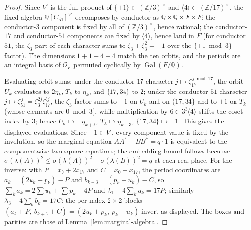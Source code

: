\documentclass[11pt]{article}
\theoremstyle{plain}
\theoremstyle{definition}
\theoremstyle{remark}
\newcommand{\Z}{\mathbb Z}
\newcommand{\Q}{\mathbb Q}
\newcommand{\Gal}{\operatorname{Gal}}
\begin{document}
\begin{proof}
Since $V'$ is the full product of $\{\pm1\}\subset(\Z/3)^\times$ and
$\langle4\rangle\subset(\Z/17)^\times$, the fixed algebra $\Q[C_{51}]^{V'}$
decomposes by conductor as $\Q\times\Q\times F\times F$: the conductor-$3$
component is fixed by all of $(\Z/3)^\times$, hence rational; the
conductor-$17$ and conductor-$51$ components are fixed by $\langle4\rangle$,
hence land in $F$ (for conductor $51$, the $\zeta_3$-part of each character
sums to $\zeta_3+\zeta_3^2=-1$ over the $\{\pm1\bmod3\}$ factor). The
dimensions $1+1+4+4$ match the ten orbits, and the periods are an integral
basis of $\mathcal O_F$ permuted cyclically by $\Gal(F/\Q)$.

Evaluating orbit sums: under the conductor-$17$ character
$j\mapsto\zeta_{17}^{\,j\bmod17}$, the orbit $U_k$ evaluates to $2\eta_k$,
$T_k$ to $\eta_k$, and $\{17,34\}$ to $2$; under the conductor-$51$ character
$j\mapsto\zeta_{51}^{\,j}=\zeta_3^{2j}\zeta_{17}^{6j}$, the $\zeta_3$-factor
sums to $-1$ on $U_k$ and on $\{17,34\}$ and to $+1$ on $T_k$ (whose elements
are $0\bmod3$), while multiplication by $6\in3^3\langle4\rangle$ shifts the
coset index by $3$; hence $U_k\mapsto-\eta_{k+3}$, $T_k\mapsto\eta_{k+3}$,
$\{17,34\}\mapsto-1$. This gives the displayed evaluations. Since $-1\in V'$,
every component value is fixed by the involution, so the marginal equation
$AA^*+BB^*=q\cdot1$ is equivalent to the componentwise two-square equations;
the embedding bound follows because
$\sigma(\lambda(A))^2\le\sigma(\lambda(A))^2+\sigma(\lambda(B))^2=q$ at each
real place. For the inverse: with $P=x_0+2x_{17}$ and $C=x_0-x_{17}$, the
period coordinates are $a_k=(2u_k+p_k)-P$ and $b_{k+3}=(p_k-u_k)-C$, so
$\sum_ka_k=2\sum u_k+\sum p_k-4P$ and $\lambda_1-4\sum_ka_k=17P$; similarly
$\lambda_3-4\sum_kb_k=17C$; the per-index $2\times2$ blocks
$(a_k+P,\;b_{k+3}+C)=(2u_k+p_k,\;p_k-u_k)$ invert as displayed. The boxes and
parities are those of Lemma~\ref{lem:marginal-algebra}.
\end{proof}
\end{document}
